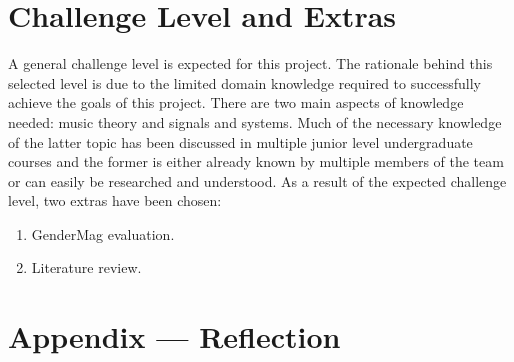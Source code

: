\documentclass{article}
\begin{document}
\section{Challenge Level and Extras}
A general challenge level is expected for this project. The rationale behind this selected level is due to
the limited domain knowledge required to successfully achieve the goals of this project. There are two main 
aspects of knowledge needed: music theory and signals and systems. Much of the necessary knowledge of the 
latter topic has been discussed in multiple junior level undergraduate courses and the former is either already
known by multiple members of the team or can easily be researched and understood.
As a result of the expected challenge level, two extras have been chosen:
\begin{enumerate}
    \item GenderMag evaluation.
    \item Literature review.
\end{enumerate}

\newpage{}

\section*{Appendix --- Reflection}


\end{document}
